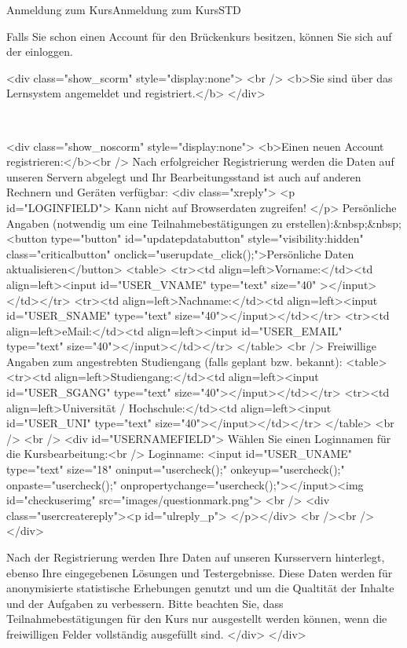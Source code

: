 \begin{MXContent}{Anmeldung zum Kurs}{Anmeldung zum Kurs}{STD}
\MGlobalConfTag
{}

Falls Sie schon einen Account für den Brückenkurs besitzen,
können Sie sich auf der  einloggen.
\begin{html}
<div class="show_scorm" style="display:none">
<br />
<b>Sie sind über das Lernsystem angemeldet und registriert.</b>
</div>
\end{html}
\ \\

\begin{html}
<div class="show_noscorm" style="display:none">
<b>Einen neuen Account registrieren:</b><br />
Nach erfolgreicher Registrierung werden die Daten auf unseren Servern abgelegt
und Ihr Bearbeitungsstand ist auch auf anderen Rechnern und Geräten verfügbar:
<div class="xreply">
<p id="LOGINFIELD">
Kann nicht auf Browserdaten zugreifen!
</p>
Persönliche Angaben (notwendig um eine Teilnahmebestätigungen zu erstellen):&nbsp;&nbsp;<button type="button" id="updatepdatabutton" style="visibility:hidden" class="criticalbutton" onclick="userupdate_click();">Persönliche Daten aktualisieren</button>
<table>
  <tr><td align=left>Vorname:</td><td align=left><input id="USER_VNAME" type="text" size="40" ></input></td></tr>
  <tr><td align=left>Nachname:</td><td align=left><input id="USER_SNAME" type="text" size="40"></input></td></tr>
  <tr><td align=left>eMail:</td><td align=left><input id="USER_EMAIL" type="text" size="40"></input></td></tr>
</table>
<br />
Freiwillige Angaben zum angestrebten Studiengang (falls geplant bzw. bekannt):
<table>
  <tr><td align=left>Studiengang:</td><td align=left><input id="USER_SGANG" type="text" size="40"></input></td></tr>
  <tr><td align=left>Universität / Hochschule:</td><td align=left><input id="USER_UNI" type="text" size="40"></input></td></tr>
</table>
<br />
<br />
<div id="USERNAMEFIELD">
Wählen Sie einen Loginnamen für die Kursbearbeitung:<br />
Loginname: <input id="USER_UNAME" type="text" size="18" oninput="usercheck();" onkeyup="usercheck();" onpaste="usercheck();" onpropertychange="usercheck();"></input><img id="checkuserimg" src="images/questionmark.png">
<br />
<div class="usercreatereply"><p id="ulreply_p"> </p></div>
<br /><br />
</div>

Nach der Registrierung werden Ihre Daten auf unseren Kursservern hinterlegt, ebenso Ihre eingegebenen Lösungen und Testergebnisse. Diese Daten werden für anonymisierte
statistische Erhebungen genutzt und um die Qualtität der Inhalte und der Aufgaben zu verbessern. Bitte beachten Sie, dass Teilnahmebestätigungen für den Kurs nur ausgestellt
werden können, wenn die freiwilligen Felder vollständig ausgefüllt sind.
</div>
</div>
\end{html}


\end{MXContent}
